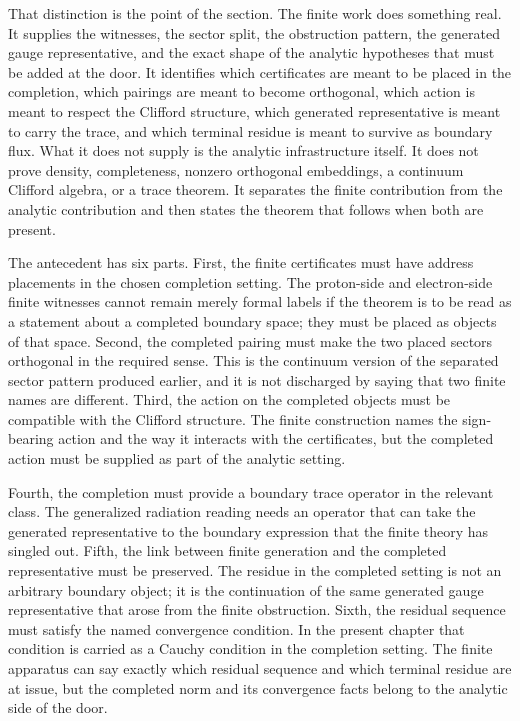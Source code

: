 That distinction is the point of the section. The finite work does something
real. It supplies the witnesses, the sector split, the obstruction pattern, the
generated gauge representative, and the exact shape of the analytic hypotheses
that must be added at the door. It identifies which certificates are meant to be
placed in the completion, which pairings are meant to become orthogonal, which
action is meant to respect the Clifford structure, which generated
representative is meant to carry the trace, and which terminal residue is meant
to survive as boundary flux. What it does not supply is the analytic
infrastructure itself. It does not prove density, completeness, nonzero
orthogonal embeddings, a continuum Clifford algebra, or a trace theorem. It
separates the finite contribution from the analytic contribution and then states
the theorem that follows when both are present.

The antecedent has six parts. First, the finite certificates must have address
placements in the chosen completion setting. The proton-side and electron-side
finite witnesses cannot remain merely formal labels if the theorem is to be read
as a statement about a completed boundary space; they must be placed as objects
of that space. Second, the completed pairing must make the two placed sectors
orthogonal in the required sense. This is the continuum version of the separated
sector pattern produced earlier, and it is not discharged by saying that two
finite names are different. Third, the action on the completed objects must be
compatible with the Clifford structure. The finite construction names the
sign-bearing action and the way it interacts with the certificates, but the
completed action must be supplied as part of the analytic setting.

Fourth, the completion must provide a boundary trace operator in the relevant
class. The generalized radiation reading needs an operator that can take the
generated representative to the boundary expression that the finite theory has
singled out. Fifth, the link between finite generation and the completed
representative must be preserved. The residue in the completed setting is not an
arbitrary boundary object; it is the continuation of the same generated gauge
representative that arose from the finite obstruction. Sixth, the residual
sequence must satisfy the named convergence condition. In the present chapter
that condition is carried as a Cauchy condition in the completion setting. The
finite apparatus can say exactly which residual sequence and which terminal
residue are at issue, but the completed norm and its convergence facts belong to
the analytic side of the door.


